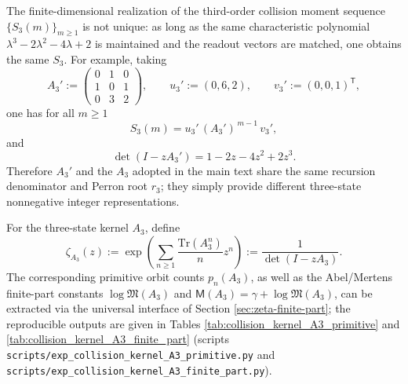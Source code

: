 \begin{remark}\label{rem:pom-a3-alternative-realization}
The finite-dimensional realization of the third-order collision moment sequence \(\{S_3(m)\}_{m\ge 1}\) is not unique: as long as the same characteristic polynomial
\(
\lambda^3-2\lambda^2-4\lambda+2
\)
is maintained and the readout vectors are matched, one obtains the same \(S_3\).
For example, taking
$$
A_3':=
\begin{pmatrix}
0&1&0\\
1&0&1\\
0&3&2
\end{pmatrix},
\qquad
u_3':=(0,6,2),\qquad
v_3':=(0,0,1)^{\mathsf T},
$$
one has for all \(m\ge 1\)
$$
S_3(m)=u_3' \, (A_3')^{\,m-1}\, v_3',
$$
and
$$
\det(I-zA_3')=1-2z-4z^2+2z^3.
$$
Therefore \(A_3'\) and the \(A_3\) adopted in the main text share the same recursion denominator and Perron root \(r_3\); they simply provide different three-state nonnegative integer representations.
\end{remark}

\begin{definition}\label{def:pom-collision-zeta-a3}
For the three-state kernel \(A_3\), define
$$
\zeta_{A_3}(z):=\exp\!\left(\sum_{n\ge 1}\frac{\mathrm{Tr}(A_3^n)}{n}z^n\right)
:=\frac{1}{\det(I-zA_3)}.
$$
The corresponding primitive orbit counts \(p_n(A_3)\), as well as the Abel/Mertens finite-part constants \(\log\mathfrak{M}(A_3)\) and \(\mathsf{M}(A_3)=\gamma+\log\mathfrak{M}(A_3)\), can be extracted via the universal interface of Section \ref{sec:zeta-finite-part}; the reproducible outputs are given in Tables \ref{tab:collision_kernel_A3_primitive} and \ref{tab:collision_kernel_A3_finite_part} (scripts \texttt{scripts/exp\_collision\_kernel\_A3\_primitive.py} and \texttt{scripts/exp\_collision\_kernel\_A3\_finite\_part.py}).
\end{definition}



